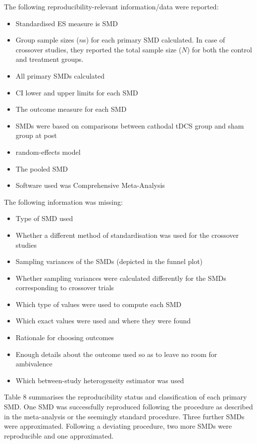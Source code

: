 \documentclass[
  man,floatsintext]{apa6}
\providecommand{\tightlist}{%
  \setlength{\itemsep}{0pt}\setlength{\parskip}{0pt}}
\begin{document}
The following reproducibility-relevant information/data were reported:

\begin{itemize}
\tightlist
\item
  Standardised ES measure is SMD
\item
  Group sample sizes (\(n\)s) for each primary SMD calculated. In case of crossover studies, they reported the total sample size (\(N\)) for both the control and treatment groups.
\item
  All primary SMDs calculated
\item
  CI lower and upper limits for each SMD
\item
  The outcome measure for each SMD
\item
  SMDs were based on comparisons between cathodal tDCS group and sham group at post
\item
  random-effects model
\item
  The pooled SMD
\item
  Software used was Comprehensive Meta-Analysis
\end{itemize}

The following information was missing:

\begin{itemize}
\tightlist
\item
  Type of SMD used
\item
  Whether a different method of standardisation was used for the crossover studies
\item
  Sampling variances of the SMDs (depicted in the funnel plot)
\item
  Whether sampling variances were calculated differently for the SMDs corresponding to crossover trials
\item
  Which type of values were used to compute each SMD
\item
  Which exact values were used and where they were found
\item
  Rationale for choosing outcomes
\item
  Enough details about the outcome used so as to leave no room for ambivalence
\item
  Which between-study heterogeneity estimator was used
\end{itemize}

Table 8 summarises the reproducibility status and classification of each primary SMD. One SMD was successfully reproduced following the procedure as described in the meta-analysis or the seemingly standard procedure. Three further SMDs were approximated. Following a deviating procedure, two more SMDs were reproducible and one approximated.
\end{document}
